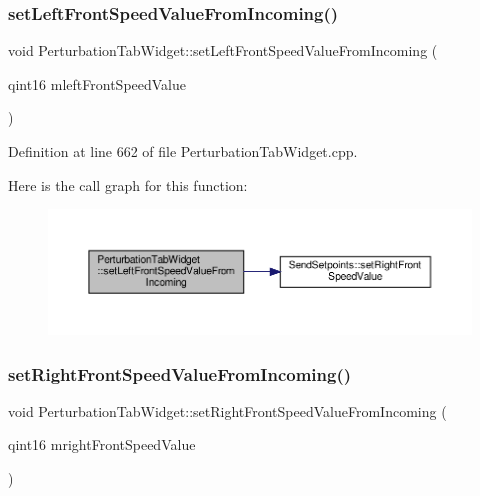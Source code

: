 \subsubsection{\texorpdfstring{set\+Left\+Front\+Speed\+Value\+From\+Incoming()}{setLeftFrontSpeedValueFromIncoming()}}
{\footnotesize\ttfamily void Perturbation\+Tab\+Widget\+::set\+Left\+Front\+Speed\+Value\+From\+Incoming (\begin{DoxyParamCaption}\item[{qint16}]{mleft\+Front\+Speed\+Value }\end{DoxyParamCaption})}



Definition at line 662 of file Perturbation\+Tab\+Widget.\+cpp.

Here is the call graph for this function\+:
\nopagebreak
\begin{figure}[H]
\begin{center}
\leavevmode
\includegraphics[width=350pt]{class_perturbation_tab_widget_ad623552392a607d427df1e76c3b0d110_cgraph}
\end{center}
\end{figure}
\mbox{\label{class_perturbation_tab_widget_a8f35140d106abf45d144a1fc6b08f423}} 
\subsubsection{\texorpdfstring{set\+Right\+Front\+Speed\+Value\+From\+Incoming()}{setRightFrontSpeedValueFromIncoming()}}
{\footnotesize\ttfamily void Perturbation\+Tab\+Widget\+::set\+Right\+Front\+Speed\+Value\+From\+Incoming (\begin{DoxyParamCaption}\item[{qint16}]{mright\+Front\+Speed\+Value }\end{DoxyParamCaption})}



